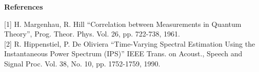 {\bf \large \sf References}\\
\hspace*{1.5cm}
\begin{minipage}[t]{13.5cm}
[1] H. Margenhau, R. Hill ``Correlation between Measurements in Quantum
Theory'', Prog. Theor. Phys. Vol. 26, pp. 722-738, 1961.\\

[2] R. Hippenstiel, P. De Oliviera ``Time-Varying Spectral Estimation Using
the Instantaneous Power Spectrum (IPS)'' IEEE Trans. on Acoust., Speech and
Signal Proc. Vol. 38, No. 10, pp. 1752-1759, 1990.
\end{minipage}

